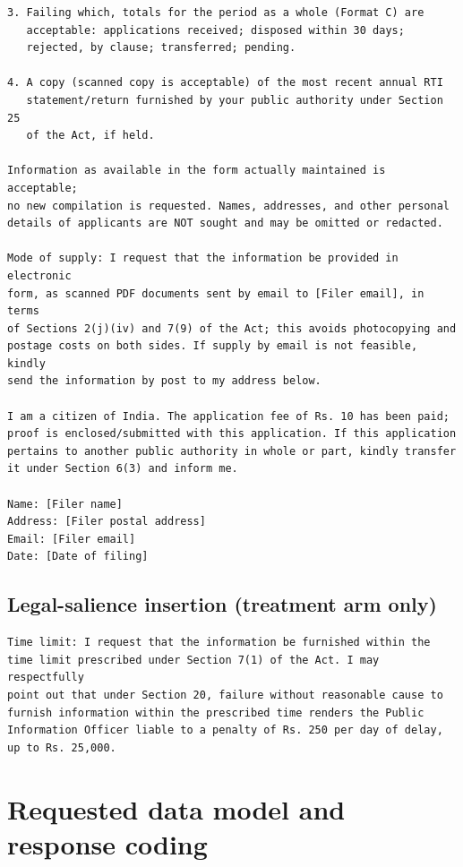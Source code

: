 \documentclass[11pt]{article}
\begin{document}
\begin{footnotesize}
\begin{verbatim}
3. Failing which, totals for the period as a whole (Format C) are
   acceptable: applications received; disposed within 30 days;
   rejected, by clause; transferred; pending.

4. A copy (scanned copy is acceptable) of the most recent annual RTI
   statement/return furnished by your public authority under Section 25
   of the Act, if held.

Information as available in the form actually maintained is acceptable;
no new compilation is requested. Names, addresses, and other personal
details of applicants are NOT sought and may be omitted or redacted.

Mode of supply: I request that the information be provided in electronic
form, as scanned PDF documents sent by email to [Filer email], in terms
of Sections 2(j)(iv) and 7(9) of the Act; this avoids photocopying and
postage costs on both sides. If supply by email is not feasible, kindly
send the information by post to my address below.

I am a citizen of India. The application fee of Rs. 10 has been paid;
proof is enclosed/submitted with this application. If this application
pertains to another public authority in whole or part, kindly transfer
it under Section 6(3) and inform me.

Name: [Filer name]
Address: [Filer postal address]
Email: [Filer email]
Date: [Date of filing]
\end{verbatim}
\end{footnotesize}

\subsection{Legal-salience insertion (treatment arm only)}
\label{si:salience}
\begin{footnotesize}
\begin{verbatim}
Time limit: I request that the information be furnished within the
time limit prescribed under Section 7(1) of the Act. I may respectfully
point out that under Section 20, failure without reasonable cause to
furnish information within the prescribed time renders the Public
Information Officer liable to a penalty of Rs. 250 per day of delay,
up to Rs. 25,000.
\end{verbatim}
\end{footnotesize}

\section{Requested data model and response coding}
\label{si:datamodel}
\end{document}
